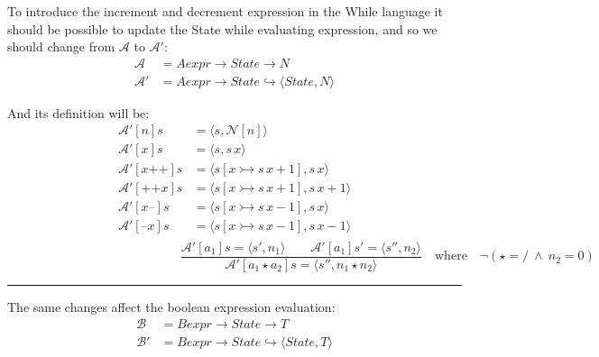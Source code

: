 \documentclass{article}
\begin{document}
To introduce the increment and decrement expression in the While language it should be possible to update the State while evaluating expression,
and so we should change from $\mathcal{A}$ to $\mathcal{A}'$:
$$ 
    \begin{aligned}
        \mathcal{A} &= Aexpr \rightarrow State \rightarrow N \\
        \mathcal{A}'&= Aexpr \rightarrow State \hookrightarrow \langle State, N\rangle
    \end{aligned}
$$

And its definition will be:
$$ 
    \begin{aligned}
        \mathcal{A}'[n]s &= \langle s, \mathcal{N}[n]\rangle \\
        \mathcal{A}'[x]s &= \langle s, s\,x \rangle \\
        \mathcal{A}'[x\texttt{++}]s &= \langle s[x\rightarrowtail s\, x +1 ], s\,x \rangle \\
        \mathcal{A}'[\texttt{++}x]s &= \langle s[x\rightarrowtail s\, x +1 ], s\,x +1 \rangle \\
        \mathcal{A}'[x\texttt{--}]s &= \langle s[x\rightarrowtail s\, x -1 ], s\,x \rangle \\
        \mathcal{A}'[\texttt{--}x]s &= \langle s[x\rightarrowtail s\, x -1 ], s\,x -1\rangle \\
    \end{aligned}
$$
\newcommand\centerFst[2]{\phantom{#2} \quad #1 \quad #2}
$$
    \centerFst{
        \frac
            {\mathcal{A}'[a_1]s = \langle s', n_1\rangle \quad\quad \mathcal{A}'[a_1]s' = \langle s'', n_2\rangle}
            {\mathcal{A}'[a_1 \star a_2]s = \langle s'', n_1 \star n_2\rangle}}
        {\mathrm{where}\quad  \lnot(\star =  /\ \land\  n_2 = 0)}
$$

\vspace{1em}
\hrule
\vspace{2em}

The same changes affect the boolean expression evaluation:
$$ 
    \begin{aligned}
        \mathcal{B} &= Bexpr \rightarrow State \rightarrow T \\
        \mathcal{B}'&= Bexpr \rightarrow State \hookrightarrow \langle State, T\rangle
    \end{aligned}
$$
\end{document}
